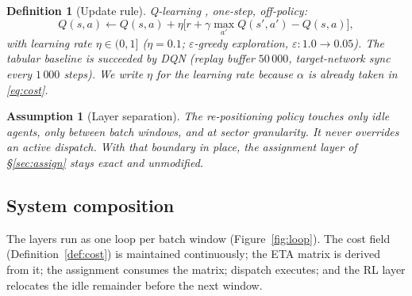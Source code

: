 \documentclass[11pt,a4paper]{article}
\theoremstyle{spaceddef}
\newtheorem{definition}{Definition}[section]
\newtheorem{assumption}{Assumption}[section]
\theoremstyle{spacedplain}
\begin{document}
\begin{definition}[Update rule]
Q-learning \cite{watkins1992}, one-step, off-policy:
\begin{equation}\label{eq:q}
Q(s,a)\leftarrow Q(s,a)+\eta\bigl[r+\gamma\max_{a'}Q(s',a')-Q(s,a)\bigr],
\end{equation}
with learning rate $\eta\in(0,1]$ ($\eta=0.1$; $\varepsilon$-greedy exploration,
$\varepsilon:1.0\to0.05$). The tabular baseline is succeeded by DQN (replay buffer
$50\,000$, target-network sync every $1\,000$ steps). We write $\eta$ for the
learning rate because $\alpha$ is already taken in \eqref{eq:cost}.
\end{definition}

\begin{assumption}[Layer separation]\label{assum:sep}
The re-positioning policy touches only idle agents, only between batch windows,
and at sector granularity. It never overrides an active dispatch. With that
boundary in place, the assignment layer of \S\ref{sec:assign} stays exact and
unmodified.
\end{assumption}

\subsection{System composition}
The layers run as one loop per batch window (Figure~\ref{fig:loop}). The cost
field (Definition~\ref{def:cost}) is maintained continuously; the ETA matrix is
derived from it; the assignment consumes the matrix; dispatch executes; and the
RL layer relocates the idle remainder before the next window.
\end{document}
